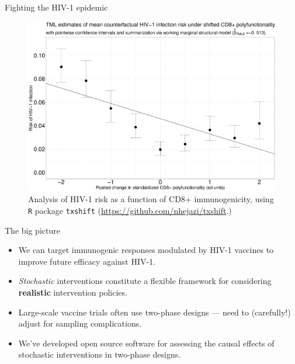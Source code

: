 \documentclass{beamer}
\begin{document}

\begin{frame}[c]{Fighting the HIV-1 epidemic}

\begin{figure}[H]
  \centering
  \includegraphics[scale=0.19]{cd8_msm_tmle_summary}
  \caption{
    Analysis of HIV-1 risk as a function of CD8+ immunogenicity, using
    \texttt{R} package \texttt{txshift}
    (\url{https://github.com/nhejazi/txshift}.)
  }
\end{figure}

\note{
}

\end{frame}


\begin{frame}[c]{The big picture}

\begin{center}
\begin{itemize}
  \itemsep8pt
  \item We can target immunogenic responses modulated by HIV-1 vaccines to
    improve future efficacy against HIV-1.
  \item \textit{Stochastic} interventions constitute a flexible framework for
    considering \textbf{realistic} intervention policies.
  \item Large-scale vaccine trials often use two-phase designs --- need to
    (carefully!) adjust for sampling complications.
  \item We've developed open source software for assessing the causal effects
     of stochastic interventions in two-phase designs.
\end{itemize}
\end{center}

\note{
}

\end{frame}
\end{document}
